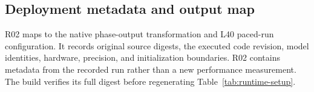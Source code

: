 \subsection{Deployment metadata and output map}
R02 maps  to the native phase-output transformation and L40 paced-run configuration. It records original source digests, the executed code revision, model identities, hardware, precision, and initialization boundaries. R02 contains metadata from the recorded run rather than a new performance measurement. The build verifies its full digest before regenerating Table~\ref{tab:runtime-setup}.
